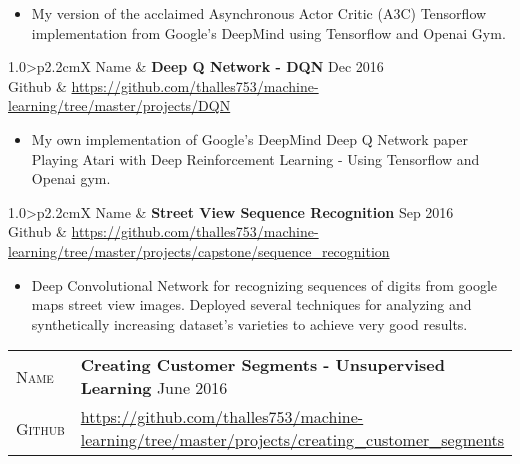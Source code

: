 \documentclass[10pt, a4paper, oneside, final]{scrartcl} %
\newcommand{\gray}{\rowcolor[gray]{.90}} %
\begin{document}
\begin{itemize}\itemsep1.5pt
\item My version of the acclaimed Asynchronous Actor Critic (A3C) Tensorflow implementation from Google's DeepMind using Tensorflow and Openai Gym.
\end{itemize}

\begin{center}
\begin{tabularx}{1.0\linewidth}{>{\raggedleft\scshape}p{2.2cm}X}
\gray Name & \textbf{Deep Q Network - DQN} \hfill Dec 2016\\
\gray Github & \url{https://github.com/thalles753/machine-learning/tree/master/projects/DQN}\\
\end{tabularx}
\end{center}

\begin{itemize}\itemsep1.5pt
\item My own implementation of Google's DeepMind Deep Q Network paper Playing Atari with Deep Reinforcement Learning - Using Tensorflow and Openai gym.
\end{itemize}

\begin{center}
\begin{tabularx}{1.0\linewidth}{>{\raggedleft\scshape}p{2.2cm}X}
\gray Name & \textbf{Street View Sequence Recognition} \hfill Sep 2016\\
\gray Github & \url{https://github.com/thalles753/machine-learning/tree/master/projects/capstone/sequence_recognition} \\
\end{tabularx}
\end{center}

\begin{itemize}\itemsep1.5pt
\item Deep Convolutional Network for recognizing sequences of digits from google maps street view images. Deployed several techniques for analyzing and synthetically increasing dataset's varieties to achieve very good results.
\end{itemize}

\begin{center}
\begin{tabularx}{1.0\linewidth}{>{\raggedleft\scshape}p{2.2cm}X}
\gray Name & \textbf{Creating Customer Segments - Unsupervised Learning} \hfill June 2016\\
\gray Github & \url{https://github.com/thalles753/machine-learning/tree/master/projects/creating_customer_segments}\\
\end{tabularx}
\end{center}
\end{document}
